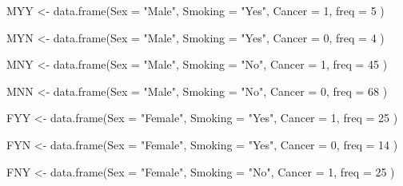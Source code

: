 \documentclass[
]{book}
\newenvironment{Shaded}{\begin{snugshade}}{\end{snugshade}}
\newcommand{\AttributeTok}[1]{\textcolor[rgb]{0.77,0.63,0.00}{#1}}
\newcommand{\DecValTok}[1]{\textcolor[rgb]{0.00,0.00,0.81}{#1}}
\newcommand{\FunctionTok}[1]{\textcolor[rgb]{0.00,0.00,0.00}{#1}}
\newcommand{\NormalTok}[1]{#1}
\newcommand{\OtherTok}[1]{\textcolor[rgb]{0.56,0.35,0.01}{#1}}
\newcommand{\StringTok}[1]{\textcolor[rgb]{0.31,0.60,0.02}{#1}}
\begin{document}
\begin{Shaded}
\begin{Highlighting}[]
\NormalTok{MYY }\OtherTok{\textless{}{-}} \FunctionTok{data.frame}\NormalTok{(}\AttributeTok{Sex =} \StringTok{"Male"}\NormalTok{,}
                  \AttributeTok{Smoking =} \StringTok{"Yes"}\NormalTok{,}
                  \AttributeTok{Cancer =} \DecValTok{1}\NormalTok{,}
                  \AttributeTok{freq =} \DecValTok{5}
\NormalTok{                  )}

\NormalTok{MYN }\OtherTok{\textless{}{-}} \FunctionTok{data.frame}\NormalTok{(}\AttributeTok{Sex =} \StringTok{"Male"}\NormalTok{,}
                  \AttributeTok{Smoking =} \StringTok{"Yes"}\NormalTok{,}
                  \AttributeTok{Cancer =} \DecValTok{0}\NormalTok{,}
                  \AttributeTok{freq =} \DecValTok{4}
\NormalTok{                  )}

\NormalTok{MNY }\OtherTok{\textless{}{-}} \FunctionTok{data.frame}\NormalTok{(}\AttributeTok{Sex =} \StringTok{"Male"}\NormalTok{,}
                  \AttributeTok{Smoking =} \StringTok{"No"}\NormalTok{,}
                  \AttributeTok{Cancer =} \DecValTok{1}\NormalTok{,}
                  \AttributeTok{freq =} \DecValTok{45}
\NormalTok{                  )}

\NormalTok{MNN }\OtherTok{\textless{}{-}} \FunctionTok{data.frame}\NormalTok{(}\AttributeTok{Sex =} \StringTok{"Male"}\NormalTok{,}
                  \AttributeTok{Smoking =} \StringTok{"No"}\NormalTok{,}
                  \AttributeTok{Cancer =} \DecValTok{0}\NormalTok{,}
                  \AttributeTok{freq =} \DecValTok{68}
\NormalTok{                  )}


\NormalTok{FYY }\OtherTok{\textless{}{-}} \FunctionTok{data.frame}\NormalTok{(}\AttributeTok{Sex =} \StringTok{"Female"}\NormalTok{,}
                  \AttributeTok{Smoking =} \StringTok{"Yes"}\NormalTok{,}
                  \AttributeTok{Cancer =} \DecValTok{1}\NormalTok{,}
                  \AttributeTok{freq =} \DecValTok{25}
\NormalTok{                  )}

\NormalTok{FYN }\OtherTok{\textless{}{-}} \FunctionTok{data.frame}\NormalTok{(}\AttributeTok{Sex =} \StringTok{"Female"}\NormalTok{,}
                  \AttributeTok{Smoking =} \StringTok{"Yes"}\NormalTok{,}
                  \AttributeTok{Cancer =} \DecValTok{0}\NormalTok{,}
                  \AttributeTok{freq =} \DecValTok{14}
\NormalTok{                  )}

\NormalTok{FNY }\OtherTok{\textless{}{-}} \FunctionTok{data.frame}\NormalTok{(}\AttributeTok{Sex =} \StringTok{"Female"}\NormalTok{,}
                  \AttributeTok{Smoking =} \StringTok{"No"}\NormalTok{,}
                  \AttributeTok{Cancer =} \DecValTok{1}\NormalTok{,}
                  \AttributeTok{freq =} \DecValTok{25}
\NormalTok{                  )}


\end{Highlighting}
\end{Shaded}
\end{document}
